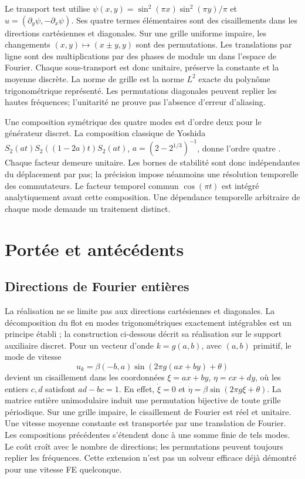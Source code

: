 \documentclass[11pt,a4paper]{article}
\begin{document}
Le transport test utilise
$\psi(x,y)=\sin^2(\pi x)\sin^2(\pi y)/\pi$ et
$u=(\partial_y\psi,-\partial_x\psi)$.
Ses quatre termes élémentaires sont des cisaillements dans les directions
cartésiennes et diagonales. Sur une grille uniforme impaire,
les changements $(x,y)\mapsto(x\pm y,y)$ sont des permutations.
Les translations par ligne sont des multiplications par des phases de
module un dans l'espace de Fourier. Chaque sous-transport est donc unitaire,
préserve la constante et la moyenne discrète. La norme de grille est la
norme $L^2$ exacte du polynôme trigonométrique représenté.
Les permutations diagonales peuvent replier les hautes fréquences;
l'unitarité ne prouve pas l'absence d'erreur d'aliasing.

Une composition symétrique des quatre modes est d'ordre deux pour le
générateur discret. La composition classique de Yoshida
$S_2(a t)S_2((1-2a)t)S_2(a t)$, $a=(2-2^{1/3})^{-1}$,
donne l'ordre quatre \cite{yoshida}. Chaque facteur demeure unitaire.
Les bornes de stabilité sont donc indépendantes du déplacement par pas;
la précision impose néanmoins une résolution temporelle des commutateurs.
Le facteur temporel commun $\cos(\pi t)$ est intégré analytiquement
avant cette composition. Une dépendance temporelle arbitraire de chaque
mode demande un traitement distinct.

\section{Portée et antécédents}
\subsection*{Directions de Fourier entières}
La réalisation ne se limite pas aux directions cartésiennes et diagonales.
La décomposition du flot en modes trigonométriques exactement intégrables
est un principe établi \cite{quispel}; la construction ci-dessous décrit
sa réalisation sur le support auxiliaire discret.
Pour un vecteur d'onde $k=g(a,b)$, avec $(a,b)$ primitif, le mode de vitesse
\[
u_k=\beta(-b,a)\sin(2\pi g(ax+by)+\theta)
\]
devient un cisaillement dans les coordonnées
$\xi=ax+by$, $\eta=cx+dy$, où les entiers $c,d$ satisfont $ad-bc=1$.
En effet, $\dot\xi=0$ et
$\dot\eta=\beta\sin(2\pi g\xi+\theta)$.
La matrice entière unimodulaire induit une permutation bijective de toute
grille périodique. Sur une grille impaire, le cisaillement de Fourier est
réel et unitaire. Une vitesse moyenne constante est transportée par une
translation de Fourier. Les compositions précédentes s'étendent donc à
une somme finie de tels modes. Le coût croît avec le nombre de directions;
les permutations peuvent toujours replier les fréquences. Cette extension
n'est pas un solveur efficace déjà démontré pour une vitesse FE quelconque.
\end{document}
